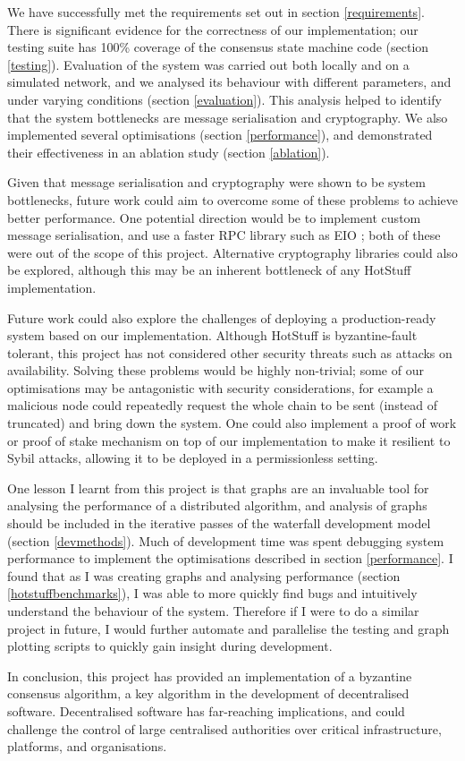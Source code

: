 We have successfully met the requirements set out in section \ref{requirements}. There is significant evidence for the correctness of our implementation; our testing suite has 100\% coverage of the consensus state machine code (section \ref{testing}). Evaluation of the system was carried out both locally and on a simulated network, and we analysed its behaviour with different parameters, and under varying conditions (section \ref{evaluation}). This analysis helped to identify that the system bottlenecks are message serialisation and cryptography. We also implemented several optimisations (section \ref{performance}), and demonstrated their effectiveness in an ablation study (section \ref{ablation}).

Given that message serialisation and cryptography were shown to be system bottlenecks, future work could aim to overcome some of these problems to achieve better performance. One potential direction would be to implement custom message serialisation, and use a faster RPC library such as EIO \cite{noauthor_eio_2023}; both of these were out of the scope of this project. Alternative cryptography libraries could also be explored, although this may be an inherent bottleneck of any HotStuff implementation.

Future work could also explore the challenges of deploying a production-ready system based on our implementation. Although HotStuff is byzantine-fault tolerant, this project has not considered other security threats such as attacks on availability. Solving these problems would be highly non-trivial; some of our optimisations may be antagonistic with security considerations, for example a malicious node could repeatedly request the whole chain to be sent (instead of truncated) and bring down the system. One could also implement a proof of work or proof of stake mechanism on top of our implementation to make it resilient to Sybil attacks, allowing it to be deployed in a permissionless setting.

One lesson I learnt from this project is that graphs are an invaluable tool for analysing the performance of a distributed algorithm, and analysis of graphs should be included in the iterative passes of the waterfall development model (section \ref{devmethods}). Much of development time was spent debugging system performance to implement the optimisations described in section \ref{performance}. I found that as I was creating graphs and analysing performance (section \ref{hotstuffbenchmarks}), I was able to more quickly find bugs and intuitively understand the behaviour of the system. Therefore if I were to do a similar project in future, I would further automate and parallelise the testing and graph plotting scripts to quickly gain insight during development.

In conclusion, this project has provided an implementation of a byzantine consensus algorithm, a key algorithm in the development of decentralised software. Decentralised software has far-reaching implications, and could challenge the control of large centralised authorities over critical infrastructure, platforms, and organisations.
